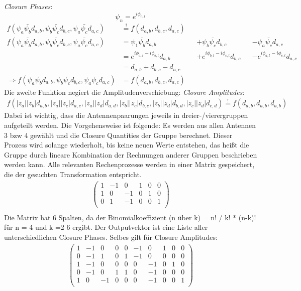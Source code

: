 \documentclass[]{dsadokumentation}
\begin{document}
\emph{Closure Phases}:
$$\psi_n = e^{i \phi_{n,t}}$$
\begin{align*}
f(\psi_a\bar{\psi_b} d_{a,b},\psi_b\bar{\psi_c}d_{b,c},\psi_a \bar{\psi_c} d_{a,c})&\overset{!}{=}f(d_{a,b},d_{b,c},d_{a,c})\\
f(\psi_a\bar{\psi_b} d_{a,b},\psi_b\bar{\psi_c}d_{b,c},\psi_a \bar{\psi_c} d_{a,c})&=\psi_1\bar{\psi_b}d_{a,b}&&+\psi_b\bar{\psi_c}d_{b,c}&&-\psi_a \bar{\psi_c} d_{a,c}\\
&=e^{i \phi_{a,t}-i\phi_{b,t}}d_{a,b}&&+e^{i \phi_{b,t}-i\phi_{c,t}}d_{b,c}&&-e^{i \phi_{a,t}-i\phi_{c,t}}d_{a,c}\\
&=d_{a,b}+d_{b,c}-d_{a,c}\\
\Rightarrow f(\psi_a\bar{\psi_b} d_{a,b},\psi_b\bar{\psi_c}d_{b,c},\psi_a \bar{\psi_c} d_{a,c})&=f(d_{a,b},d_{b,c},d_{a,c})
\end{align*}
Die zweite Funktion negiert die Amplitudenverschiebung:
\emph{Closure Amplitudes}:
\begin{align*}
f(|z_a||z_b|d_{a, b}, |z_a||z_c|d_{a, c}, |z_a||z_d|d_{a, d}, |z_b||z_c|d_{b, c}, |z_b||z_d|d_{b, d}, |z_c||z_d|d_{c, d})\overset{!}{=}f(d_{a, b}, d_{a, b}, d_{a, b})
\end{align*}
Dabei ist wichtig, dass die Antennenpaarungen jeweils in dreier-/vierergruppen aufgeteilt werden. Die Vorgehensweise ist folgende: Es werden aus allen Antennen 3 bzw 4 gewählt und die Closure Quantities der Gruppe berechnet. Dieser Prozess wird solange wiederholt, bis keine neuen Werte entstehen, das heißt die Gruppe durch lineare Kombination der Rechnungen anderer Gruppen beschrieben werden kann. Alle relevanten Rechenprozesse werden in einer Matrix gespeichert, die der gesuchten Transformation entspricht.
\begin{gather*}
\begin{pmatrix}
1&-1&0&1&0&0 \\
1&0&-1&0&1&0 \\
0&1&-1&0&0&1 \\
\end{pmatrix}\\
\end{gather*}
Die Matrix hat 6 Spalten, da der Binomialkoeffizient (n über k) = n! / k! * (n-k)! für n = 4 und k =2 6 ergibt. Der Outputvektor ist eine Liste aller unterschiedlichen Closure Phases. Selbes gilt für Closure Amplitudes:
\begin{gather*}
\begin{pmatrix}
1&-1&0&0&0&-1&0&1&0&0 \\
0&-1&1&0&1&-1&0&0&0&0 \\
1&-1&0&0&0&0&-1&0&1&0 \\
0&-1&0&1&1&0&-1&0&0&0 \\
1&0&-1&0&0&0&-1&0&0&1 \\
\end{pmatrix}
\end{gather*}
\end{document}
